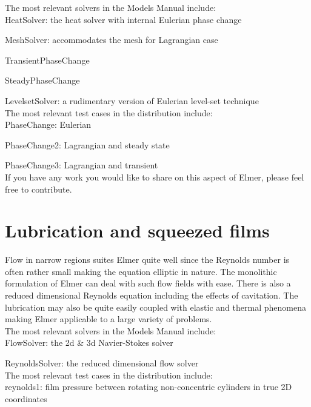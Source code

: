 \noindent The most relevant solvers in the Models Manual include:\\

    HeatSolver: the heat solver with internal Eulerian phase change

    MeshSolver: accommodates the mesh for Lagrangian case

    TransientPhaseChange

    SteadyPhaseChange

    LevelsetSolver: a rudimentary version of Eulerian level-set technique\\

\noindent The most relevant test cases in the distribution include:\\

    PhaseChange: Eulerian

    PhaseChange2: Lagrangian and steady state

    PhaseChange3: Lagrangian and transient\\

\noindent If you have any work you would like to share on this aspect of Elmer, please feel free to contribute. 

\section{Lubrication and squeezed films}

Flow in narrow regions suites Elmer quite well since the Reynolds number is often rather small making the equation elliptic in nature. The monolithic formulation of Elmer can deal with such flow fields with ease. There is also a reduced dimensional Reynolds equation including the effects of cavitation. The lubrication may also be quite easily coupled with elastic and thermal phenomena making Elmer applicable to a large variety of problems.\\

\noindent The most relevant solvers in the Models Manual include:\\

    FlowSolver: the 2d \& 3d Navier-Stokes solver

    ReynoldsSolver: the reduced dimensional flow solver\\

\noindent The most relevant test cases in the distribution include:\\

    reynolds1: film pressure between rotating non-concentric cylinders in true 2D coordinates

